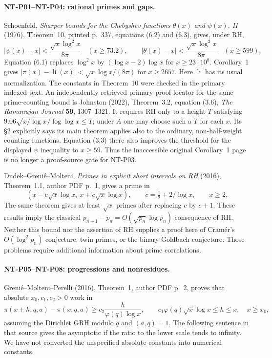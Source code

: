 \paragraph{NT-P01--NT-P04: rational primes and gaps.}
Schoenfeld, \emph{Sharper bounds for the Chebyshev functions
$\theta(x)$ and $\psi(x)$. II} (1976), Theorem~10, printed p.~337,
equations (6.2) and (6.3), gives, under RH,
\[
 |\psi(x)-x|<\frac{\sqrt{x}\log^2x}{8\pi}\quad(x\ge73.2),\qquad
 |\theta(x)-x|<\frac{\sqrt{x}\log^2x}{8\pi}\quad(x\ge599).
\]
Equation (6.1) replaces $\log^2x$ by $(\log x-2)\log x$ for
$x\ge23\cdot10^8$.  Corollary~1 gives
$|\pi(x)-\operatorname{li}(x)|<\sqrt{x}\log x/(8\pi)$ for
$x\ge2657$.  Here $\operatorname{li}$ has its usual normalization.
The constants in Theorem~10 were checked in the primary indexed text.
An independently retrieved primary proof locator for the same
prime-counting bound is Johnston (2022), Theorem~3.2, equation (3.6),
\emph{The Ramanujan Journal} \textbf{59}, 1307--1321.
It requires RH only to a height $T$ satisfying
$9.06\sqrt{x/\log x}/\log\log x\le T$; under $A$ one may choose
such a $T$ for each $x$.  Its \S2 explicitly says its main theorem applies
also to the ordinary, non-half-weight counting functions.  Equation (3.3)
there also improves the threshold for the displayed $\psi$ inequality
to $x\ge59$.  Thus the inaccessible original Corollary~1 page is no
longer a proof-source gate for NT-P03.

Dudek--Greni\'e--Molteni, \emph{Primes in explicit short intervals on RH}
(2016), Theorem~1.1, author PDF p.~1, gives a prime in
\[
 (x-c\sqrt{x}\log x,\ x+c\sqrt{x}\log x),
 \qquad c=\tfrac12+2/\log x,\qquad x\ge2.
\]
The same theorem gives at least $\sqrt{x}$ primes after replacing $c$ by
$c+1$.  These results imply the classical
$p_{n+1}-p_n=O(\sqrt{p_n}\log p_n)$ consequence of RH.  Neither this
bound nor the assertion of RH supplies a proof here of Cram\'er's
$O(\log^2p_n)$ conjecture, twin primes, or the binary Goldbach conjecture.
Those problems require additional information about prime correlations.

\paragraph{NT-P05--NT-P08: progressions and nonresidues.}
Greni\'e--Molteni--Perelli (2016), Theorem~1, author PDF p.~2, proves that
absolute $x_0,c_1,c_2>0$ work in
\[
 \pi(x+h;q,a)-\pi(x;q,a)\ge
 c_2\frac{h}{\varphi(q)\log x},\qquad
 c_1\varphi(q)\sqrt{x}\log x\le h\le x,\quad x\ge x_0,
\]
assuming the Dirichlet GRH modulo $q$ and $(a,q)=1$.  The following
sentence in that source gives the asymptotic if the ratio to the lower
scale tends to infinity.  We have not converted the unspecified absolute
constants into numerical constants.

